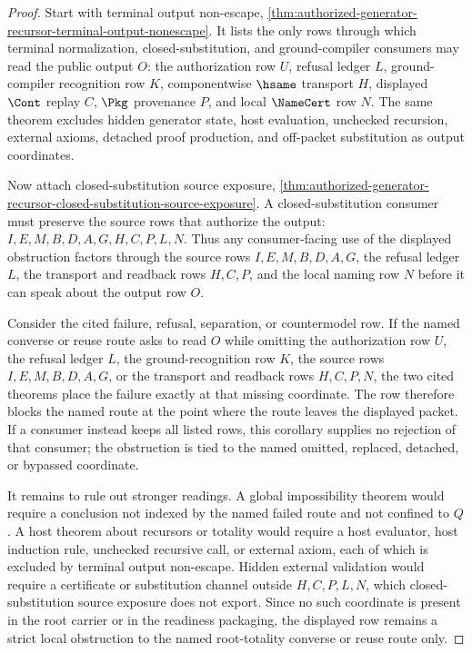 \begin{proof}
Start with terminal output non-escape, \autoref{thm:authorized-generator-recursor-terminal-output-nonescape}. It lists the only rows through which terminal normalization, closed-substitution, and ground-compiler consumers may read the public output $O$: the authorization row $U$, refusal ledger $L$, ground-compiler recognition row $K$, componentwise $\hsame$ transport $H$, displayed $\Cont$ replay $C$, $\Pkg$ provenance $P$, and local $\NameCert$ row $N$. The same theorem excludes hidden generator state, host evaluation, unchecked recursion, external axioms, detached proof production, and off-packet substitution as output coordinates.

Now attach closed-substitution source exposure, \autoref{thm:authorized-generator-recursor-closed-substitution-source-exposure}. A closed-substitution consumer must preserve the source rows that authorize the output: $I,E,M,B,D,A,G,H,C,P,L,N$. Thus any consumer-facing use of the displayed obstruction factors through the source rows $I,E,M,B,D,A,G$, the refusal ledger $L$, the transport and readback rows $H,C,P$, and the local naming row $N$ before it can speak about the output row $O$.

Consider the cited failure, refusal, separation, or countermodel row. If the named converse or reuse route asks to read $O$ while omitting the authorization row $U$, the refusal ledger $L$, the ground-recognition row $K$, the source rows $I,E,M,B,D,A,G$, or the transport and readback rows $H,C,P,N$, the two cited theorems place the failure exactly at that missing coordinate. The row therefore blocks the named route at the point where the route leaves the displayed packet. If a consumer instead keeps all listed rows, this corollary supplies no rejection of that consumer; the obstruction is tied to the named omitted, replaced, detached, or bypassed coordinate.

It remains to rule out stronger readings. A global impossibility theorem would require a conclusion not indexed by the named failed route and not confined to $Q$. A host theorem about recursors or totality would require a host evaluator, host induction rule, unchecked recursive call, or external axiom, each of which is excluded by terminal output non-escape. Hidden external validation would require a certificate or substitution channel outside $H,C,P,L,N$, which closed-substitution source exposure does not export. Since no such coordinate is present in the root carrier or in the readiness packaging, the displayed row remains a strict local obstruction to the named root-totality converse or reuse route only.
\end{proof}
